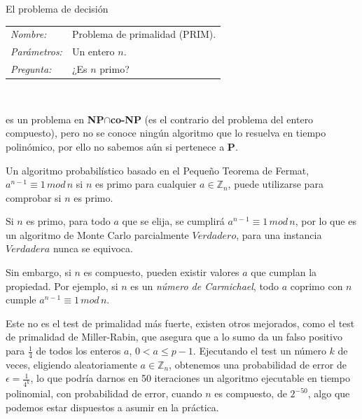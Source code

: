 \begin{example}
	El problema de decisión
	
	\begin{tabular}{|ll}
		\textit{Nombre:} & Problema de primalidad (PRIM). \\
		\textit{Parámetros:} & Un entero $n$. \\
		\textit{Pregunta:} & ¿Es $n$ primo? \\
	\end{tabular}
	\\
	\hfil
	
	es un problema en \textbf{NP}$\cap$\textbf{co-NP} (es el contrario del problema del entero compuesto), pero no se conoce ningún algoritmo que lo resuelva en tiempo polinómico, por ello no sabemos aún si pertenece a \textbf{P}.
	
	Un algoritmo probabilístico basado en el Pequeño Teorema de Fermat, $a^{n-1} \equiv 1 \, mod \, n$ si $n$ es primo para cualquier $a\in \mathbb{Z}_n$, puede utilizarse para comprobar si $n$ es primo.
	
	Si $n$ es primo, para todo $a$ que se elija, se cumplirá $a^{n-1} \equiv 1 \, mod \, n$, por lo que es un algoritmo de Monte Carlo parcialmente $Verdadero$, para una instancia $Verdadera$ nunca se equivoca.
	
	Sin embargo, si $n$ es compuesto, pueden existir valores $a$ que cumplan la propiedad. Por ejemplo, si $n$ es un \textit{número de Carmichael}, todo $a$ coprimo con $n$ cumple $a^{n-1} \equiv 1 \, mod \, n$.
	
	Este no es el test de primalidad más fuerte, existen otros mejorados, como el test de primalidad de Miller-Rabin, que asegura que a lo sumo da un falso positivo para $\frac{1}{4}$ de todos los enteros $a$, $0<a\leq p-1$. Ejecutando el test un número $k$ de veces, eligiendo aleatoriamente $a\in \mathbb{Z}_n$, obtenemos una probabilidad de error de $\epsilon=\frac{1}{4^k}$, lo que podría darnos en 50 iteraciones un algoritmo ejecutable en tiempo polinomial, con probabilidad de error, cuando $n$ es compuesto, de $2^{-50}$, algo que podemos estar dispuestos a asumir en la práctica.
	
\end{example}

